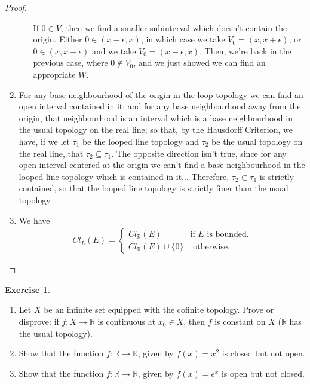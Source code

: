 \documentclass[12pt]{extarticle}
\newcommand{\set}[1]{\{#1\}}
\newcommand{\R}{\mathbb{R}}
\newcommand{\<}{\langle}
\renewcommand{\>}{\rangle}
\theoremstyle{definition}
\newtheorem{exercise}{Exercise}
\begin{document}
\begin{proof}
\begin{enumerate}
\begin{itemize}
      If $0 \in V$, then we find a smaller subinterval which doesn't contain the origin. Either $0 \in (x-\epsilon,x)$, in which case we take $V_0 = (x, x+\epsilon)$,
      or $0 \in (x, x+\epsilon)$ and we take $V_0 = (x-\epsilon, x)$. Then, we're back in the previous case, where $0 \not \in V_0$, and we just showed we can find an appropriate $W$.
    \end{itemize}
  \item
    For any base neighbourhood of the origin in the loop topology we can find an open interval contained in it; and for any base neighbourhood
    away from the origin, that neighbourhood is an interval which is a base neighbourhood in the usual topology on the real line; so that,
    by the Hausdorff Criterion, we have, if we let $\tau_1$ be the looped line topology and $\tau_2$ be the usual topology on the real line, that $\tau_2 \subseteq \tau_1$. The opposite direction isn't true, since for any open interval centered at the origin we can't find a base neighbourhood in the looped line topology which is contained in it... Therefore, $\tau_2 \subset \tau_1$ is strictly contained, so that the looped line topology is strictly finer than the usual topology.
  \item
    We have
    \begin{align*}
      Cl_L(E) =
      \begin{cases}
        Cl_{\R}(E) & \text{if } E \text{ is bounded.} \\
        Cl_{\R}(E) \cup \set{0} & \text{ otherwise.}
      \end{cases}
    \end{align*}
  \end{enumerate}
\end{proof}
\begin{exercise}
  \begin{enumerate}
  \item
    Let $X$ be an infinite set equipped with the cofinite topology. Prove or disprove: if $f: X \to \R$ is continuous at $x_0 \in X$,
    then $f$ is constant on $X$ ($\R$ has the usual topology).
  \item
    Show that the function $f:\R \to \R$, given by $f(x)=x^2$ is closed but not open.
  \item
    Show that the function $f:\R \to \R$, given by $f(x)=e^x$ is open but not closed. 
  \end{enumerate}
\end{exercise}
\end{document}
